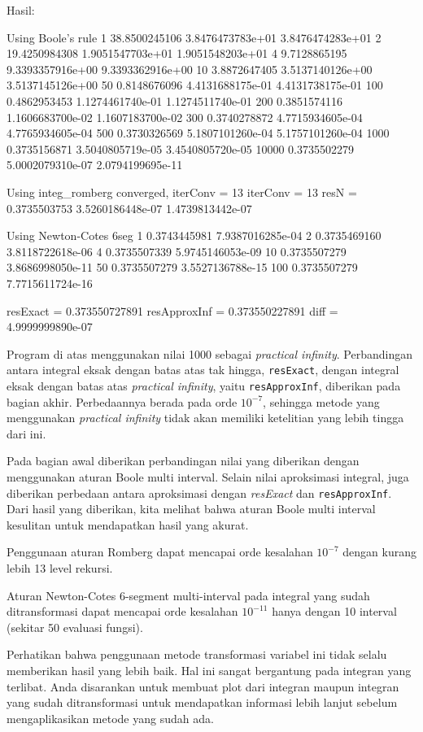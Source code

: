 \documentclass[a4paper,11pt,bahasa]{article} %
\newcommand{\pyinline}[1]{\texttt{#1}}
\begin{document}
Hasil:
\begin{textcode}
Using Boole's rule
    1      38.8500245106   3.8476473783e+01   3.8476474283e+01
    2      19.4250984308   1.9051547703e+01   1.9051548203e+01
    4       9.7128865195   9.3393357916e+00   9.3393362916e+00
   10       3.8872647405   3.5137140126e+00   3.5137145126e+00
   50       0.8148676096   4.4131688175e-01   4.4131738175e-01
  100       0.4862953453   1.1274461740e-01   1.1274511740e-01
  200       0.3851574116   1.1606683700e-02   1.1607183700e-02
  300       0.3740278872   4.7715934605e-04   4.7765934605e-04
  500       0.3730326569   5.1807101260e-04   5.1757101260e-04
 1000       0.3735156871   3.5040805719e-05   3.4540805720e-05
10000       0.3735502279   5.0002079310e-07   2.0794199695e-11

Using integ_romberg
converged, iterConv =  13
iterConv =  13
resN =       0.3735503753   3.5260186448e-07   1.4739813442e-07

Using Newton-Cotes 6seg
    1       0.3743445981   7.9387016285e-04
    2       0.3735469160   3.8118722618e-06
    4       0.3735507339   5.9745146053e-09
   10       0.3735507279   3.8686998050e-11
   50       0.3735507279   3.5527136788e-15
  100       0.3735507279   7.7715611724e-16

resExact     =     0.373550727891
resApproxInf =     0.373550227891
diff         =   4.9999999890e-07
\end{textcode}

Program di atas menggunakan nilai 1000 sebagai \textit{practical infinity}.
Perbandingan antara integral eksak dengan batas atas tak hingga, \pyinline{resExact},
dengan integral eksak dengan batas atas \textit{practical infinity},
yaitu \pyinline{resApproxInf}, diberikan pada
bagian akhir. Perbedaannya berada pada orde $10^{-7}$, sehingga metode
yang menggunakan \textit{practical infinity} tidak akan memiliki ketelitian
yang lebih tingga dari ini.

Pada bagian awal diberikan perbandingan nilai yang diberikan dengan menggunakan
aturan Boole multi interval. Selain nilai aproksimasi integral, juga diberikan
perbedaan antara aproksimasi dengan \textit{resExact} dan \pyinline{resApproxInf}.
Dari hasil yang diberikan, kita melihat bahwa aturan Boole multi interval
kesulitan untuk mendapatkan hasil yang akurat.

Penggunaan aturan Romberg dapat mencapai orde kesalahan $10^{-7}$
dengan kurang lebih 13 level rekursi.

Aturan Newton-Cotes 6-segment multi-interval pada integral yang sudah
ditransformasi dapat mencapai orde kesalahan $10^{-11}$ hanya dengan 10 interval
(sekitar 50 evaluasi fungsi).

Perhatikan bahwa penggunaan metode transformasi variabel ini tidak selalu
memberikan hasil yang lebih baik. Hal ini sangat bergantung pada integran yang
terlibat.
Anda disarankan untuk membuat plot dari integran maupun
integran yang sudah ditransformasi untuk mendapatkan informasi lebih lanjut
sebelum mengaplikasikan metode yang sudah ada.
\end{document}
